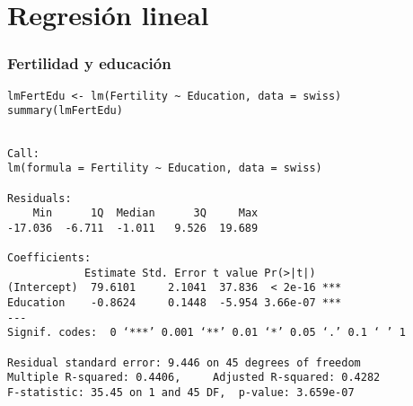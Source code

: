 \documentclass{beamer}
\begin{document}
\section{Regresión lineal}
\label{sec-3}
\begin{frame}[fragile]
\frametitle{Fertilidad y educación}
\label{sec-3-1}


\lstset{language=R}
\begin{lstlisting}
lmFertEdu <- lm(Fertility ~ Education, data = swiss)
summary(lmFertEdu)
\end{lstlisting}


\begin{verbatim}

Call:
lm(formula = Fertility ~ Education, data = swiss)

Residuals:
    Min      1Q  Median      3Q     Max 
-17.036  -6.711  -1.011   9.526  19.689 

Coefficients:
            Estimate Std. Error t value Pr(>|t|)    
(Intercept)  79.6101     2.1041  37.836  < 2e-16 ***
Education    -0.8624     0.1448  -5.954 3.66e-07 ***
---
Signif. codes:  0 ‘***’ 0.001 ‘**’ 0.01 ‘*’ 0.05 ‘.’ 0.1 ‘ ’ 1 

Residual standard error: 9.446 on 45 degrees of freedom
Multiple R-squared: 0.4406,     Adjusted R-squared: 0.4282 
F-statistic: 35.45 on 1 and 45 DF,  p-value: 3.659e-07
\end{verbatim}
\end{frame}
\end{document}
